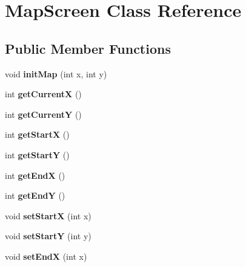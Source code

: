 \hypertarget{class_map_screen}{}\section{Map\+Screen Class Reference}
\label{class_map_screen}
\subsection*{Public Member Functions}
\begin{DoxyCompactItemize}
\item 
\hypertarget{class_map_screen_a7ec8d9c66912e402e57bfdd7778a5b13}{}\label{class_map_screen_a7ec8d9c66912e402e57bfdd7778a5b13} 
void {\bfseries init\+Map} (int x, int y)
\item 
\hypertarget{class_map_screen_af90b7b04c0534eca6587e27ec20c116e}{}\label{class_map_screen_af90b7b04c0534eca6587e27ec20c116e} 
int {\bfseries get\+CurrentX} ()
\item 
\hypertarget{class_map_screen_ad351362c23dc6d214ef04656ab82746a}{}\label{class_map_screen_ad351362c23dc6d214ef04656ab82746a} 
int {\bfseries get\+CurrentY} ()
\item 
\hypertarget{class_map_screen_a172790eebb34a12a54902779185f3737}{}\label{class_map_screen_a172790eebb34a12a54902779185f3737} 
int {\bfseries get\+StartX} ()
\item 
\hypertarget{class_map_screen_a4b81f948186249a2a03e5b18d3b8a45f}{}\label{class_map_screen_a4b81f948186249a2a03e5b18d3b8a45f} 
int {\bfseries get\+StartY} ()
\item 
\hypertarget{class_map_screen_a4809056226797d7dcdc7989e30412abb}{}\label{class_map_screen_a4809056226797d7dcdc7989e30412abb} 
int {\bfseries get\+EndX} ()
\item 
\hypertarget{class_map_screen_ab61eb74b352f9faaf258cbf51afd99d6}{}\label{class_map_screen_ab61eb74b352f9faaf258cbf51afd99d6} 
int {\bfseries get\+EndY} ()
\item 
\hypertarget{class_map_screen_a65f5581be2db9d0493df849c2c99b170}{}\label{class_map_screen_a65f5581be2db9d0493df849c2c99b170} 
void {\bfseries set\+StartX} (int x)
\item 
\hypertarget{class_map_screen_afbaa726dc7180c94da7eeb3214e8e8f0}{}\label{class_map_screen_afbaa726dc7180c94da7eeb3214e8e8f0} 
void {\bfseries set\+StartY} (int y)
\item 
\hypertarget{class_map_screen_a96ef52b100fba7b34f3b3914a9f2b92a}{}\label{class_map_screen_a96ef52b100fba7b34f3b3914a9f2b92a} 
void {\bfseries set\+EndX} (int x)

\end{DoxyCompactItemize}
